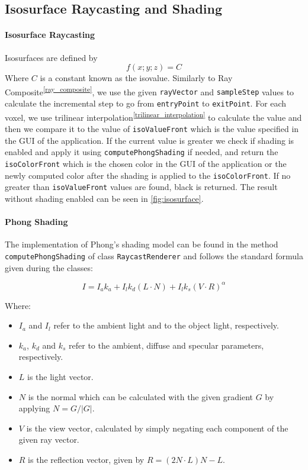 \documentclass[a4paper]{article}
\begin{document}
\subsection{Isosurface Raycasting and Shading}
\label{subsec:isosurface}

\paragraph{Isosurface Raycasting}

Isosurfaces are defined by
 $$f(x; y; z) = C$$ 
Where $C$ is a constant known as the isovalue. Similarly to Ray Composite\textsuperscript{\autoref{ray_composite}}, we use the given {\tt rayVector} and {\tt sampleStep} values to calculate the incremental step to go from {\tt entryPoint} to {\tt exitPoint}. For each voxel, we use trilinear interpolation\textsuperscript{\autoref{trilinear_interpolation}} to calculate the value and then we compare it to the value of {\tt isoValueFront} which is the value specified in the GUI of the application. If the current value is greater we check if shading is enabled and apply it using {\tt computePhongShading} if needed, and return the {\tt isoColorFront} which is the chosen color in the GUI of the application or the newly computed color after the shading is applied to the  {\tt isoColorFront}. If no greater than {\tt isoValueFront} values are found, black is returned. The result without shading enabled can be seen in \autoref{fig:isosurface}.

\paragraph{Phong Shading}

The implementation of Phong's shading model can be found in the method {\tt computePhongShading} of class {\tt RaycastRenderer} and follows the standard formula given during the classes:

$$ I = I_a k_a + I_lk_d(L \cdot N)+I_l k_s (V \cdot R)^\alpha$$

Where:
\begin{itemize}[noitemsep]
  \item $I_a$ and $I_l$ refer to the ambient light and to the object light, respectively.
  \item $k_a$, $k_d$ and $k_s$ refer to the ambient, diffuse and specular parameters, respectively.
  \item $L$ is the light vector.
  \item $N$ is the normal which can be calculated with the given gradient $G$ by applying $N= {G}/{|G|}$.
  \item $V$ is the view vector, calculated by simply negating each component of the given ray vector.
  \item $R$ is the reflection vector, given by $R = (2N \cdot L)N-L$.
\end{itemize}
\end{document}
